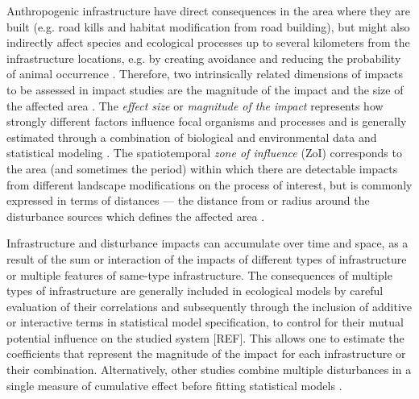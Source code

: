 \documentclass[titlepage]{article}
\begin{document}
Anthropogenic infrastructure have direct consequences in the area where they are built (e.g. road kills and habitat modification from road building), but might also indirectly affect species and ecological processes up to several kilometers from the infrastructure locations, e.g. by creating avoidance and reducing the probability of animal occurrence \citep{johnson_cumulative_2005,torres_assessing_2016}. Therefore, two intrinsically related dimensions of impacts to be assessed in impact studies are the magnitude of the impact and the size of the affected area \citep[Box 1; ][]{naugle_unifying_2011}. The \textit{effect size} or \textit{magnitude of the impact} represents how strongly different factors influence focal organisms and processes and is generally estimated through a combination of biological and environmental data and statistical modeling \citep[Box 1;][]{polfus_identifying_2011}. The spatiotemporal \textit{zone of influence} (ZoI) 
corresponds to the area (and sometimes the period) within which there are detectable impacts from different landscape modifications on the process of interest, but is commonly expressed in terms of distances --- the distance from or radius around the disturbance sources which defines the affected area \citep[Box 1;][]{ boulanger_estimating_2012}. 

Infrastructure and disturbance impacts can accumulate over time and space, as a result of the sum or interaction of the impacts of different types of infrastructure or multiple features of same-type infrastructure. The consequences of multiple types of infrastructure are generally included in ecological models by careful evaluation of their correlations \citep{dormann_collinearity_2013} and subsequently through the inclusion of additive or interactive terms in statistical model specification, to control for their mutual potential influence on the studied system [REF]. This allows one to estimate the coefficients that represent the magnitude of the impact for each infrastructure or their combination. 
Alternatively, other studies combine multiple disturbances in a single measure of cumulative effect before fitting statistical models \citep{venter_sixteen_2016, tucker_moving_2018}. 
\end{document}
